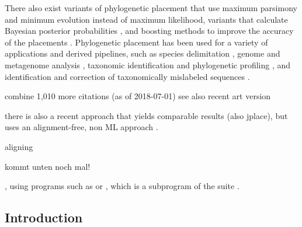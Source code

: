 There also exist variants of phylogenetic placement that use maximum parsimony \cite{Berger2011}
and minimum evolution \cite{Filipski2015} instead of maximum likelihood,
variants that calculate Bayesian posterior probabilities \cite{Matsen2010},
and boosting methods to improve the accuracy of the placements \cite{Mirarab2012}.
Phylogenetic placement has been used for a variety of applications and derived pipelines, such as
species delimitation \cite{Zhang2013,Kapli2017},
genome and metagenome analysis \cite{Darling2014},
taxonomic identification and phylogenetic profiling \cite{Nguyen2014}, and
identification and correction of taxonomically mislabeled sequences \cite{Kozlov2016}.

combine 1,010 more citations (as of 2018-07-01)
see also recent art version

there is also a recent approach that yields comparable results (also jplace), but uses an alignment-free, non ML approach \cite{Linard2018}.


aligning

kommt unten noch mal!

, using programs such as  \citep{Berger2011a,Berger2012} or
, which is a subprogram of the  suite \citep{Eddy1998,Eddy2009}.


\subsection{Introduction}
\label{ch:Foundations:sec:PhylogeneticPlacement:sub:Introduction}


